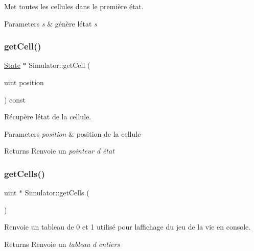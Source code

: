 Met toutes les cellules dans le première état. 


\begin{DoxyParams}{Parameters}
{\em s} & génère l\textquotesingle{}état {\itshape s} \\
\hline
\end{DoxyParams}
\mbox{\label{class_simulator_ae70ae4a330ecf02f4a9a19117c2f72ec}} 
\subsubsection{\texorpdfstring{get\+Cell()}{getCell()}}
{\footnotesize\ttfamily \mbox{\hyperlink{class_state}{State}} $\ast$ Simulator\+::get\+Cell (\begin{DoxyParamCaption}\item[{uint}]{position }\end{DoxyParamCaption}) const}



Récupère l\textquotesingle{}état de la cellule. 


\begin{DoxyParams}{Parameters}
{\em position} & position de la cellule \\
\hline
\end{DoxyParams}
\begin{DoxyReturn}{Returns}
Renvoie un {\itshape pointeur} {\itshape d\textquotesingle{}} {\itshape état} 
\end{DoxyReturn}
\mbox{\label{class_simulator_a109fa6ef9088ac9c5ac77a6b88cc3e4a}} 
\subsubsection{\texorpdfstring{get\+Cells()}{getCells()}}
{\footnotesize\ttfamily uint $\ast$ Simulator\+::get\+Cells (\begin{DoxyParamCaption}{ }\end{DoxyParamCaption})}



Renvoie un tableau de 0 et 1 utilisé pour l\textquotesingle{}affichage du jeu de la vie en console. 

\begin{DoxyReturn}{Returns}
Renvoie un {\itshape tableau} {\itshape d\textquotesingle{}} {\itshape entiers} 
\end{DoxyReturn}
\mbox{\label{class_simulator_af8c7d5fb578ec01756750f90b2b78312}} 
